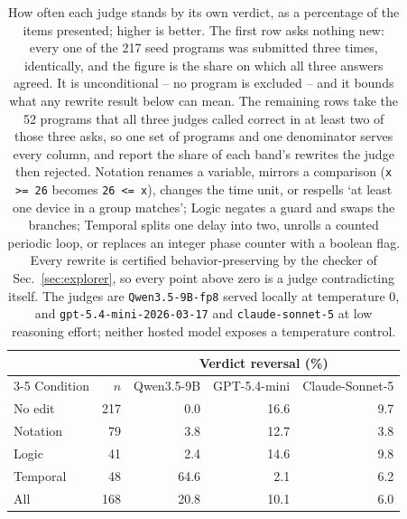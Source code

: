 \begin{table}[t]
\centering
\caption{How often each judge stands by its own verdict, as a percentage of the items presented; higher is better. The first row asks nothing new: every one of the 217 seed programs was submitted three times, identically, and the figure is the share on which all three answers agreed. It is unconditional -- no program is excluded -- and it bounds what any rewrite result below can mean. The remaining rows take the 52 programs that all three judges called correct in at least two of those three asks, so one set of programs and one denominator serves every column, and report the share of each band's rewrites the judge then rejected. Notation renames a variable, mirrors a comparison (\texttt{x >= 26} becomes \texttt{26 <= x}), changes the time unit, or respells `at least one device in a group matches'; Logic negates a guard and swaps the branches; Temporal splits one delay into two, unrolls a counted periodic loop, or replaces an integer phase counter with a boolean flag. Every rewrite is certified behavior-preserving by the checker of Sec.~\ref{sec:explorer}, so every point above zero is a judge contradicting itself. The judges are \texttt{Qwen3.5-9B-fp8} served locally at temperature 0, and \texttt{gpt-5.4-mini-2026-03-17} and \texttt{claude-sonnet-5} at low reasoning effort; neither hosted model exposes a temperature control.}
\label{tab:judge}
\footnotesize
\setlength{\tabcolsep}{3pt}
\begin{tabular}{lr rrr}
\toprule
 & & \multicolumn{3}{c}{Verdict reversal (\%)} \\
\cmidrule(lr){3-5}
Condition & $n$ & Qwen3.5-9B & GPT-5.4-mini & Claude-Sonnet-5 \\
\midrule
No edit & 217 & 0.0 & 16.6 & 9.7 \\
\midrule
Notation & 79 & 3.8 & 12.7 & 3.8 \\
Logic & 41 & 2.4 & 14.6 & 9.8 \\
Temporal & 48 & 64.6 & 2.1 & 6.2 \\
\midrule
All & 168 & 20.8 & 10.1 & 6.0 \\
\bottomrule
\end{tabular}
\end{table}

